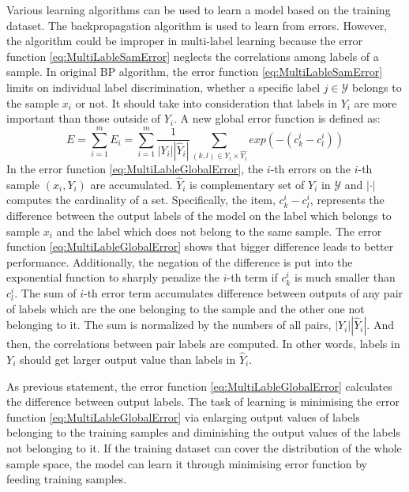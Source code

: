 Various learning algorithms can be used to learn a model based on the training dataset. The backpropagation algorithm is used to learn from errors. However, the algorithm could be improper in multi-label learning because the error function \ref{eq:MultiLableSamError} neglects the correlations among labels of a sample. In original BP algorithm, the error function \ref{eq:MultiLableSamError} limits on individual label discrimination, whether a specific label $j \in \mathcal{Y}$ belongs to the sample $x_{i}$ or not. It should take into consideration that labels in $Y_{i}$ are more important than those outside of $Y_{i}$. A new global error function is defined as:
\begin{equation}\label{eq:MultiLableGlobalError}
E = \sum_{i=1}^m E_{i} = \sum_{i=1}^m \frac{1}{|Y_{i}||\hat{Y}_{i}|} \sum_{(k,l) \in Y_{i} \times \hat{Y_{i}}} exp(-(c_{k}^i-c_{l}^i))
\end{equation}
In the error function \ref{eq:MultiLableGlobalError}, the $i$-th errors on the $i$-th sample $(x_{i},Y_{i})$ are accumulated. $\hat{Y}_{i}$ is complementary set of $Y_{i}$ in $\mathcal{Y}$ and $|\cdot|$ computes the cardinality of a set. Specifically, the item, $c_{k}^i-c_{l}^i$, represents the difference between the output labels of the model on the label which belongs to sample $x_{i}$ and the label which does not belong to the same sample. The error function \ref{eq:MultiLableGlobalError} shows that bigger difference leads to better performance. Additionally, the negation of the difference is put into the exponential function to sharply penalize the $i$-th term if $c_{k}^i$ is much smaller than $c_{l}^i$. The sum of $i$-th error term accumulates difference between outputs of any pair of labels which are the one belonging to the sample and the other one not belonging to it. The sum is normalized by the numbers of all pairs, $|Y_{i}||\hat{Y}_{i}|$. And then, the correlations between pair labels are computed. In other words, labels in $Y_{i}$ should get larger output value than labels in $\hat{Y}_{i}$.

As previous statement, the error function \ref{eq:MultiLableGlobalError} calculates the difference between output labels. The task of learning is minimising the error function \ref{eq:MultiLableGlobalError} via enlarging output values of labels belonging to the training samples and diminishing the output values of the labels not belonging to it. If the training dataset can cover the distribution of the whole sample space, the model can learn it through minimising error function by feeding training samples.

